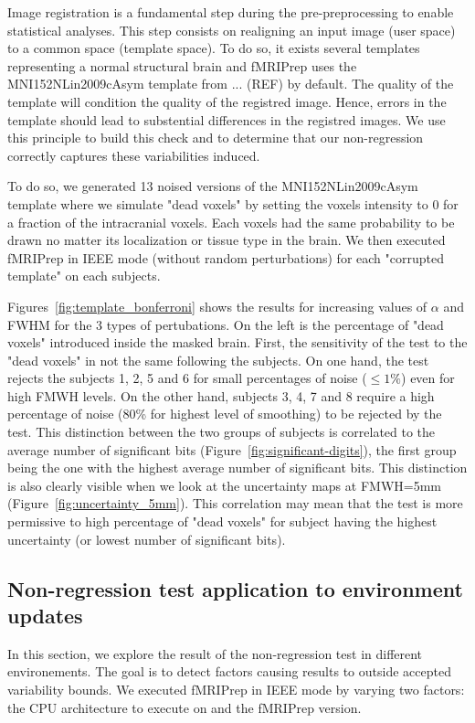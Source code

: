 \documentclass{article}
\newcommand{\fmriprep}{fMRIPrep\xspace}
\begin{document}
Image registration is a fundamental step during the pre-preprocessing to enable
statistical analyses. This step consists on realigning an input image (user
space) to a common space (template space). To do so, it exists several templates
representing a normal structural brain and \fmriprep uses the
MNI152NLin2009cAsym template from ... (REF) by default. The quality of the template will
condition the quality of the registred image. Hence, errors in the template
should lead to substential differences in the registred images. We use this
principle to build this check and to determine that our non-regression correctly
captures these variabilities induced.

To do so, we generated 13 noised versions of the MNI152NLin2009cAsym template where
we simulate "dead voxels" by setting the voxels intensity to 0 for a fraction of the intracranial voxels.
Each voxels had the same probability to be drawn no matter its localization or tissue type in the brain.
We then executed \fmriprep in IEEE mode (without random perturbations) for each "corrupted template" on each subjects.

Figures~\ref{fig:template_bonferroni} shows the results for increasing values of
$\alpha$ and FWHM for the 3 types of pertubations. On the left is the percentage
of "dead voxels" introduced inside the masked brain. First, the sensitivity of
the test to the "dead voxels" in not the same following the subjects. On one
hand, the test rejects the subjects 1, 2, 5 and 6 for small percentages of noise
($\leq 1\%$) even for high FMWH levels. On the other hand, subjects 3, 4, 7 and
8 require a high percentage of noise (80\% for highest level of smoothing) to be
rejected by the test. This distinction between the two groups of subjects is
correlated to the average number of significant bits
(Figure~\ref{fig:significant-digits}), the first group being the one with the
highest average number of significant bits. This distinction is also clearly
visible when we look at the uncertainty maps at FMWH=5mm
(Figure~\ref{fig:uncertainty_5mm}). This correlation may mean that
the test is more permissive to high percentage of "dead voxels" for
subject having the highest uncertainty (or lowest number of significant bits).

\subsection{Non-regression test application to environment updates}

In this section, we explore the result of the non-regression test in different environements.
The goal is to detect factors causing results to outside accepted variability bounds.
We executed \fmriprep in IEEE mode by varying two factors: the CPU architecture to execute on and the \fmriprep version.
\end{document}
